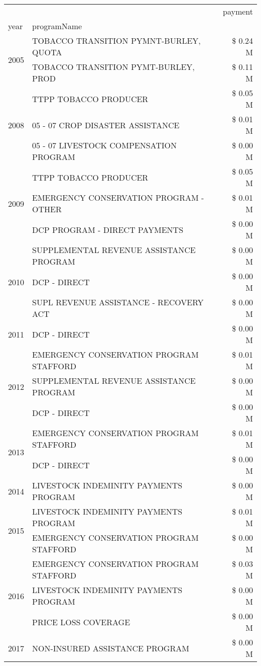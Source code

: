 \begin{tabular}{llr}
\toprule
 &  & payment \\
year & programName &  \\
\midrule
\multirow[t]{2}{*}{2005} & TOBACCO TRANSITION PYMNT-BURLEY, QUOTA & \$ 0.24 M \\
 & TOBACCO TRANSITION PYMT-BURLEY, PROD & \$ 0.11 M \\
\cline{1-3}
\multirow[t]{3}{*}{2008} & TTPP TOBACCO PRODUCER & \$ 0.05 M \\
 & 05 - 07 CROP DISASTER ASSISTANCE & \$ 0.01 M \\
 & 05 - 07 LIVESTOCK COMPENSATION PROGRAM & \$ 0.00 M \\
\cline{1-3}
\multirow[t]{3}{*}{2009} & TTPP TOBACCO PRODUCER & \$ 0.05 M \\
 & EMERGENCY CONSERVATION PROGRAM - OTHER & \$ 0.01 M \\
 & DCP PROGRAM - DIRECT PAYMENTS & \$ 0.00 M \\
\cline{1-3}
\multirow[t]{3}{*}{2010} & SUPPLEMENTAL REVENUE ASSISTANCE PROGRAM & \$ 0.00 M \\
 & DCP - DIRECT & \$ 0.00 M \\
 & SUPL REVENUE ASSISTANCE - RECOVERY ACT & \$ 0.00 M \\
\cline{1-3}
2011 & DCP - DIRECT & \$ 0.00 M \\
\cline{1-3}
\multirow[t]{3}{*}{2012} & EMERGENCY CONSERVATION PROGRAM STAFFORD & \$ 0.01 M \\
 & SUPPLEMENTAL REVENUE ASSISTANCE PROGRAM & \$ 0.00 M \\
 & DCP - DIRECT & \$ 0.00 M \\
\cline{1-3}
\multirow[t]{2}{*}{2013} & EMERGENCY CONSERVATION PROGRAM STAFFORD & \$ 0.01 M \\
 & DCP - DIRECT & \$ 0.00 M \\
\cline{1-3}
2014 & LIVESTOCK INDEMINITY PAYMENTS PROGRAM & \$ 0.00 M \\
\cline{1-3}
\multirow[t]{2}{*}{2015} & LIVESTOCK INDEMINITY PAYMENTS PROGRAM & \$ 0.01 M \\
 & EMERGENCY CONSERVATION PROGRAM STAFFORD & \$ 0.00 M \\
\cline{1-3}
\multirow[t]{3}{*}{2016} & EMERGENCY CONSERVATION PROGRAM STAFFORD & \$ 0.03 M \\
 & LIVESTOCK INDEMINITY PAYMENTS PROGRAM & \$ 0.00 M \\
 & PRICE LOSS COVERAGE & \$ 0.00 M \\
\cline{1-3}
\multirow[t]{2}{*}{2017} & NON-INSURED ASSISTANCE PROGRAM & \$ 0.00 M \\

\end{tabular}
